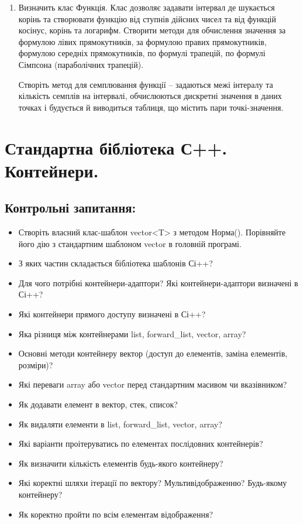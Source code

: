 \documentclass[a5paper,titlepage,openany,twoside,draft]{book_unv}%
\begin{document}
\begin{enumerate}
\item
Визначить клас Функція. Клас дозволяє задавати інтервал де шукається корінь та створювати функцію 
від ступнів дійсних чисел та від функцій косінус, корінь та логарифм. 
Створити методи для обчислення значення за формулою лівих прямокутників, 
за формулою правих прямокутників, формулою середніх прямокутників, 
по формулі трапецій, по формулі Сімпсона (параболічних трапецій).

Створіть метод для семплювання функції -- задаються межі інтералу та кількість 
семплів на інтервалі, обчислюються дискретні значення в даних точках і будується
 й виводиться таблиця, що містить пари точкі-значення.

\end{enumerate}


\chapter{Стандартна бібліотека С++. Контейнери.}
%

\section{Контрольні запитання:}
\begin{itemize}
\item
  Створіть власний клас-шаблон vector\textless{}T\textgreater{} з
  методом Норма(). Порівняйте його дію з стандартним шаблоном vector в
  головній програмі.
\item
  З яких частин складається бібліотека шаблонів Сі++?
\item
  Для чого потрібні контейнери-адаптори? Які контейнери-адаптори
  визначені в Сі++?
\item
  Які контейнери прямого доступу визначені в Сі++?
\item
  Яка різниця між контейнерами list, forward\_list, vector, array?
\item
  Основні методи контейнеру вектор (доступ до елементів, заміна
  елементів, розміри)?
\item
  Які переваги array або vector перед стандартним масивом чи
  вказівником?
\item
  Як додавати елемент в вектор, стек, список?
\item
  Як видаляти елементи в list, forward\_list, vector, array?
\item
  Які варіанти проітеруватись по елементах послідовних контейнерів?

\item
Як визначити кількість елементів будь-якого контейнеру?
\item
Які коректні шляхи ітерації по вектору? Мультивідображенню? Будь-якому
контейнеру?
\item
Як коректно пройти по всім елементам відображення?

\end{itemize}
\end{document}

